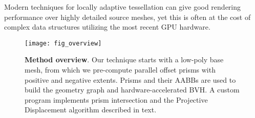Modern techniques for locally adaptive tessellation can give good rendering performance over highly detailed source meshes, yet this is often at the cost of complex data structures utilizing the most recent GPU hardware.

\begin{figure}
  \texttt{[image: fig\_overview]}
  \caption{\textbf{Method overview}. Our technique starts with a low-poly base mesh, from which we pre-compute parallel offset prisms with positive and negative extents. Prisms and their AABBs are used to build the geometry graph and hardware-accelerated BVH. A custom program implements prism intersection and the Projective Displacement algorithm described in text.}
 \label{fig:overview}
\end{figure}